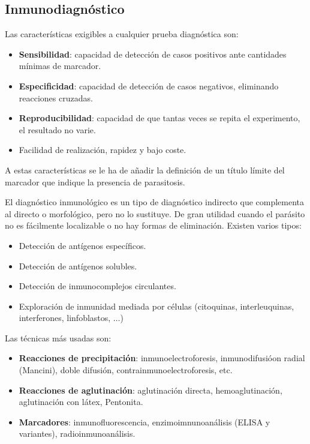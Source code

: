 \subsection{Inmunodiagnóstico}
Las características exigibles a cualquier prueba diagnóstica son:
\begin{itemize}[itemsep=0pt,parsep=0pt,topsep=0pt,partopsep=0pt]
	\item \textbf{Sensibilidad}: capacidad de detección de casos positivos ante cantidades mínimas de marcador.
	\item\textbf{Especificidad}: capacidad de detección de casos negativos, eliminando reacciones cruzadas.
	\item\textbf{Reproducibilidad}: capacidad de que tantas veces se repita el experimento, el resultado no varie.
	\item Facilidad de realización, rapidez y bajo coste.
\end{itemize}
A estas características se le ha de añadir la definición de un título límite del marcador que indique la presencia de parasitosis.

El diagnóstico inmunológico es un tipo de diagnóstico indirecto que complementa al directo o morfológico, pero no lo sustituye. De gran utilidad cuando el parásito no es fácilmente localizable o no hay formas de eliminación. Existen varios tipos:
\begin{itemize}[itemsep=0pt,parsep=0pt,topsep=0pt,partopsep=0pt]
	\item Detección de antígenos específicos.
	\item Detección de antígenos solubles.
	\item Detección de inmunocomplejos circulantes.
	\item Exploración de inmunidad mediada por células (citoquinas, interleuquinas, interferones, linfoblastos, $\dots$)
\end{itemize}
Las técnicas más usadas son:
\begin{itemize}[itemsep=0pt,parsep=0pt,topsep=0pt,partopsep=0pt]
	\item \textbf{Reacciones de precipitación}: inmunoelectroforesis, inmunodifusióon radial (Mancini), doble difusión, contrainmunoelectroforesis, etc.
	\item\textbf{Reacciones de aglutinación}: aglutinación directa, hemoaglutinación, aglutinación con látex, Pentonita.
	\item\textbf{Marcadores}: inmunofluorescencia, enzimoimnunoanálisis (ELISA y variantes), radioinmunoanálisis.
\end{itemize}
